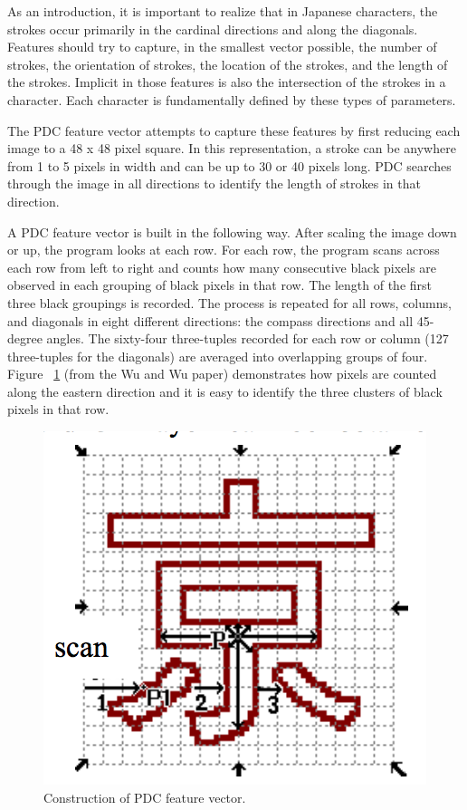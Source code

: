 \documentclass[10pt,twocolumn,letterpaper]{article}
\begin{document}
As an introduction, it is important to realize that in Japanese characters, the strokes  occur primarily in the cardinal directions and along the diagonals. Features should try to capture, in the smallest vector possible, the number of strokes, the orientation of strokes, the location of the strokes, and the length of the strokes. Implicit in those features is also the intersection of the strokes in a character. Each character is fundamentally defined by these types of parameters.

The PDC feature vector attempts to capture these features by first reducing each image to a 48 x 48 pixel square. In this representation, a stroke can be anywhere from 1 to 5 pixels in width and can be up to 30 or 40 pixels long. PDC searches through the image in all directions to identify the length of strokes in that direction.

A PDC feature vector is built in the following way. After scaling the image down or up, the program looks at each row. For each row, the program scans across each row from left to right and counts how many consecutive black pixels are observed in each grouping of black pixels in that row. The length of the first three black groupings is recorded. The process is repeated for all rows, columns, and diagonals in eight different directions: the compass directions and all 45-degree angles. The sixty-four three-tuples recorded for each row or column (127 three-tuples for the diagonals) are averaged into overlapping groups of four. Figure ~\ref{fig:pdc} (from the Wu and Wu paper) demonstrates how pixels are counted along the eastern direction and it is easy to identify the three clusters of black pixels in that row.

\begin{figure}[t]
    \centering
    \includegraphics[width=0.7\columnwidth]{../pdc.png}
    \caption{Construction of PDC feature vector.}
    \label{fig:pdc}
\end{figure}
\end{document}
